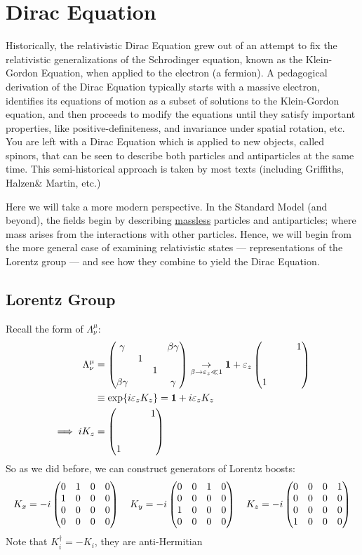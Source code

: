\newcommand{\sla}[1]{\slashed{#1}}
\newcommand{\slap}{\slashed{p}}
\section{Dirac Equation}
Historically, the relativistic Dirac Equation grew out of an attempt to fix the relativistic generalizations of the Schrodinger equation, known as the Klein-Gordon Equation, when applied to the electron (a fermion). A pedagogical derivation of the Dirac Equation typically starts with a massive electron, identifies its equations of motion as a subset of solutions to the Klein-Gordon equation, and then proceeds to modify the equations until they satisfy important properties, like positive-definiteness, and invariance under spatial rotation, etc. You are left with a Dirac Equation which is applied to new objects, called spinors, that can be seen to describe both particles and antiparticles at the same time. This semi-historical approach is taken by most texts (including Griffiths, Halzen\& Martin, etc.)

Here we will take a more modern perspective. In the Standard Model (and beyond), the fields begin by describing \underline{massless} particles and antiparticles; where mass arises from the interactions with other particles. Hence, we will begin from the more general case of examining relativistic states --- representations of the Lorentz group --- and see how they combine to yield the Dirac Equation.

\subsection{Lorentz Group}
Recall the form of $\Lambda^\mu_\nu$:
\begin{align*}
  \Lambda^\mu_\nu&=\pmqty{\gamma&&&\beta\gamma\\&1\\&&1\\\beta\gamma&&&\gamma}
  \underset{\beta\to\veps_z\ll 1}{\to}\bm{1}+\veps_z\pmqty{&&&1\\ \\ \\ 1}\\
  &\equiv\exp{i\veps_z K_z}=\bm{1}+i\veps_z K_z\\
  \implies iK_z&=\pmqty{&&&1\\ \\ \\1}
\end{align*}
So as we did before, we can construct generators of Lorentz boosts:
\begin{align*}
  K_x=-i\pmqty{0&1&0&0\\1&0&0&0\\0&0&0&0\\0&0&0&0}\quad
  K_y=-i\pmqty{0&0&1&0\\0&0&0&0\\1&0&0&0\\0&0&0&0}\quad
  K_z=-i\pmqty{0&0&0&1\\0&0&0&0\\0&0&0&0\\1&0&0&0}
\end{align*}
Note that $K^\dag_i=-K_i$, they are anti-Hermitian

